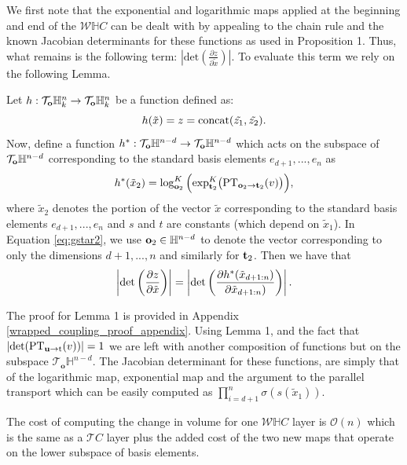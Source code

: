 \begin{proofsketch}
We first note that the exponential and logarithmic maps applied at the beginning and end of the $\mathcal{W}\mathbb{H}C$ can be dealt with by appealing to the chain rule and the known Jacobian determinants for these functions as used in Proposition 1.  
Thus, what remains is the following term: $\left|\textrm{det}\left(\frac{\partial z}{\partial \tilde{x}}\right)\right|$. To evaluate this term we rely on the following Lemma.
\begin{lemma}
Let $h : \mathcal{T}_{\mathbf{o}}\mathbb{H}^n_k \rightarrow \mathcal{T}_{\mathbf{o}}\mathbb{H}^n_k$ be a function defined as:
\begin{equation}\label{eq:g2}
h(\tilde{x}) = z = \textnormal{concat}(\tilde{z_1}, \tilde{z_2}).
\end{equation}
Now, define a function $h^* : \mathcal{T}_{\mathbf{o}}\mathbb{H}^{n-d} \rightarrow \mathcal{T}_{\mathbf{o}}\mathbb{H}^{n-d}$ which acts on the subspace of $\mathcal{T}_{\mathbf{o}}\mathbb{H}^{n-d}$ corresponding to the standard basis elements $e_{d+1}, ..., e_n$ as
\begin{equation}\label{eq:gstar2}
h^*(\tilde{x}_{2}) =   \log_{\mathbf{o}_{2}}^K\Big( \textnormal{exp}_{\mathbf{t}_{2}}^K\big(\textnormal{PT}_{\mathbf{o}_{2} \to \mathbf{t}_{2}}(v)\big)\Big),
\end{equation}
where $\tilde{x}_{2}$ denotes the portion of the vector $\tilde{x}$ corresponding to the standard basis elements $e_{d+1}, ..., e_n$ and $s$ and $t$ are constants (which depend on $\tilde{x}_{1}$).
In Equation \eqref{eq:gstar2}, we use $\mathbf{o}_{2} \in \mathbb{H}^{n-d}$ to denote the vector corresponding to only the dimensions $d+1, ..., n$ and similarly for $\mathbf{t}_{2}$.
Then we have that
\begin{equation}
    \left|\textnormal{det}\left(\frac{\partial z}{\partial \tilde{x}}\right)\right| =    \left|\textnormal{det}\left(\frac{\partial h^*(\tilde{x}_{d+1:n})}{\partial \tilde{x}_{d+1:n})}\right)\right|.
\end{equation}
\end{lemma}
The proof for Lemma 1 is provided in Appendix \ref{wrapped_coupling_proof_appendix}. Using Lemma 1, and the fact that $|\textnormal{det}(\textnormal{PT}_{\textbf{u}\to\textnormal{t}}(v))| = 1$ \cite{nagano2019wrapped} we are left with another composition of functions but on the subspace $\mathcal{T}_{\textbf{o}}\mathbb{H}^{n-d}$. The Jacobian determinant for these functions, are simply that of the logarithmic map, exponential map and the argument to the parallel transport which can be easily computed as $\prod_{i=d+1}^n \sigma(s(\tilde{x}_1))$. 
\end{proofsketch}
The cost of computing the change in volume for one $\mathcal{W}\mathbb{H}C$ layer is $\mathcal{O}(n)$ which is the same as a $\mathcal{T}C$ layer plus the added cost of the two new maps that operate on the lower subspace of basis elements.
